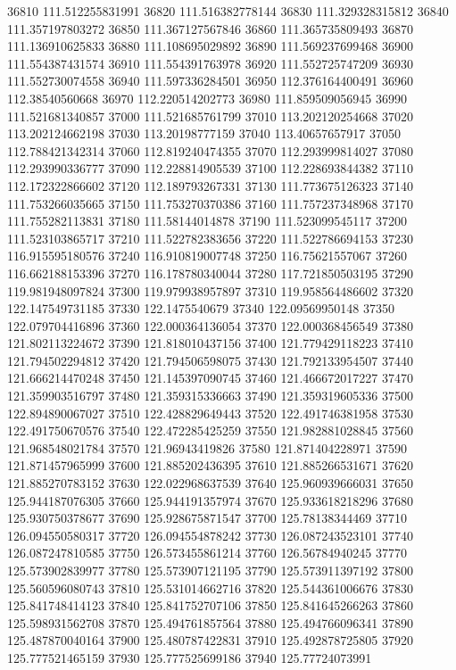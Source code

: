 {36810 111.512255831991
36820 111.516382778144
36830 111.329328315812
36840 111.357197803272
36850 111.367127567846
36860 111.365735809493
36870 111.136910625833
36880 111.108695029892
36890 111.569237699468
36900 111.554387431574
36910 111.554391763978
36920 111.552725747209
36930 111.552730074558
36940 111.597336284501
36950 112.376164400491
36960 112.38540560668
36970 112.220514202773
36980 111.859509056945
36990 111.521681340857
37000 111.521685761799
37010 113.202120254668
37020 113.202124662198
37030 113.20198777159
37040 113.40657657917
37050 112.788421342314
37060 112.819240474355
37070 112.293999814027
37080 112.293990336777
37090 112.228814905539
37100 112.228693844382
37110 112.172322866602
37120 112.189793267331
37130 111.773675126323
37140 111.753266035665
37150 111.753270370386
37160 111.757237348968
37170 111.755282113831
37180 111.58144014878
37190 111.523099545117
37200 111.523103865717
37210 111.522782383656
37220 111.522786694153
37230 116.915595180576
37240 116.910819007748
37250 116.75621557067
37260 116.662188153396
37270 116.178780340044
37280 117.721850503195
37290 119.981948097824
37300 119.979938957897
37310 119.958564486602
37320 122.147549731185
37330 122.1475540679
37340 122.09569950148
37350 122.079704416896
37360 122.000364136054
37370 122.000368456549
37380 121.802113224672
37390 121.818010437156
37400 121.779429118223
37410 121.794502294812
37420 121.794506598075
37430 121.792133954507
37440 121.666214470248
37450 121.145397090745
37460 121.466672017227
37470 121.359903516797
37480 121.359315336663
37490 121.359319605336
37500 122.894890067027
37510 122.428829649443
37520 122.491746381958
37530 122.491750670576
37540 122.472285425259
37550 121.982881028845
37560 121.968548021784
37570 121.96943419826
37580 121.871404228971
37590 121.871457965999
37600 121.885202436395
37610 121.885266531671
37620 121.885270783152
37630 122.022968637539
37640 125.960939666031
37650 125.944187076305
37660 125.944191357974
37670 125.933618218296
37680 125.930750378677
37690 125.928675871547
37700 125.78138344469
37710 126.094550580317
37720 126.094554878242
37730 126.087243523101
37740 126.087247810585
37750 126.573455861214
37760 126.56784940245
37770 125.573902839977
37780 125.573907121195
37790 125.573911397192
37800 125.560596080743
37810 125.531014662716
37820 125.544361006676
37830 125.841748414123
37840 125.841752707106
37850 125.841645266263
37860 125.598931562708
37870 125.494761857564
37880 125.494766096341
37890 125.487870040164
37900 125.480787422831
37910 125.492878725805
37920 125.777521465159
37930 125.777525699186
37940 125.77724073991
}
